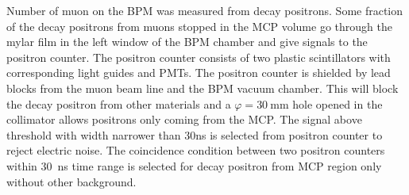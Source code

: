 \documentclass[preprint,3p,twocolumn]{elsarticle}
\begin{document}
Number of muon on the BPM was measured from decay positrons.
Some fraction of the decay positrons from muons stopped in the MCP volume go through the mylar film in the left window of the BPM chamber and give signals to the positron counter. 
The positron counter consists of two plastic scintillators with corresponding light guides and PMTs. %
The positron counter is shielded by lead blocks from the muon beam line and the BPM vacuum chamber. This will block the decay positron from other materials and a $\varphi=\SI{30}{\mm}$ hole opened in the collimator allows positrons only coming from the MCP.
The signal above threshold with width narrower than 30ns is selected from positron counter to reject electric noise. 
The coincidence condition between two positron counters within \SI{30}{\ns} time range is selected for decay positron from MCP region only without other background.
\end{document}
